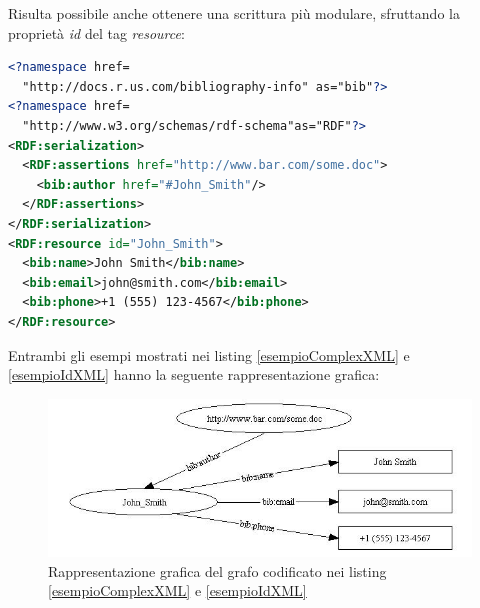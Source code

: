 \documentclass[12pt,a4paper,twoside]{book}
\begin{document}
Risulta possibile anche ottenere una scrittura più modulare, sfruttando la proprietà \textit{id} del tag \textit{resource}:
\begin{lstlisting}[language=xml,firstnumber=1,caption={Esempio di metadato conforme ad RDF in XML},captionpos=b,label=esempioIdXML]
<?namespace href=
  "http://docs.r.us.com/bibliography-info" as="bib"?> 
<?namespace href=
  "http://www.w3.org/schemas/rdf-schema"as="RDF"?> 
<RDF:serialization> 
  <RDF:assertions href="http://www.bar.com/some.doc"> 
    <bib:author href="#John_Smith"/> 
  </RDF:assertions> 
</RDF:serialization>
<RDF:resource id="John_Smith"> 
  <bib:name>John Smith</bib:name> 
  <bib:email>john@smith.com</bib:email> 
  <bib:phone>+1 (555) 123-4567</bib:phone> 
</RDF:resource> 
\end{lstlisting}
Entrambi gli esempi mostrati nei listing \ref{esempioComplexXML} e \ref{esempioIdXML} hanno la seguente rappresentazione grafica:
\begin{figure}[H]
\centering
\includegraphics[scale=.50]{../immagini/complexXML.jpg}
\caption{Rappresentazione grafica del grafo codificato nei listing \ref{esempioComplexXML} e \ref{esempioIdXML}}
\label{imgEsempioComplexXML}
\end{figure}
\end{document}
